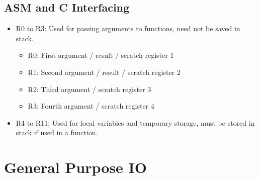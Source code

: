 \documentclass[a4paper,12pt,openany]{book}
\begin{document}
\section{ASM and C Interfacing}
\begin{itemize}
    \item R0 to R3: Used for passing arguments to functions, need not be saved in stack.
    \begin{itemize}
        \item R0: First argument / result / scratch register 1
        \item R1: Second argument / result / scratch register 2
        \item R2: Third argument / scratch register 3
        \item R3: Fourth argument / scratch register 4
    \end{itemize}
    \item R4 to R11: Used for local variables and temporary storage, must be stored in stack if used in a function.
\end{itemize}

\chapter{General Purpose IO}
\end{document}
